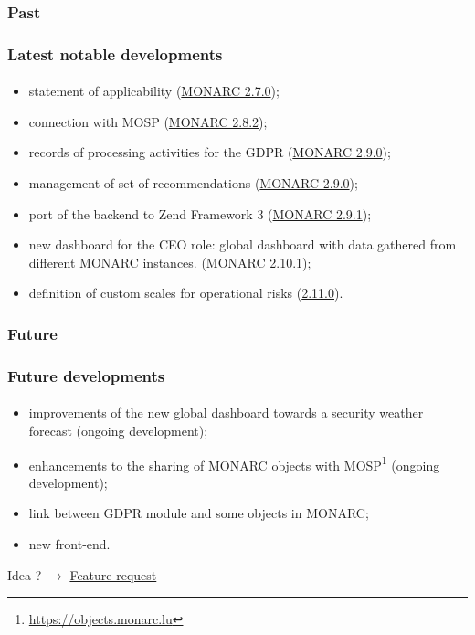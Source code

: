 \subsubsection{Past}
\begin{frame}
    \frametitle{Latest notable developments}
    \framesubtitle{}
    \begin{itemize}
      \item statement of applicability (\href{https://www.monarc.lu/news/2018/08/22/monarc-270-released/}{MONARC 2.7.0});
      \item connection with MOSP (\href{https://www.monarc.lu/news/2019/05/28/monarc-282-released/}{MONARC 2.8.2});
      \item records of processing activities for the GDPR (\href{https://www.monarc.lu/news/2019/08/23/monarc-290-released/}{MONARC 2.9.0});
      \item management of set of recommendations (\href{https://www.monarc.lu/news/2019/08/23/monarc-290-released/}{MONARC 2.9.0});
      \item port of the backend to Zend Framework 3 (\href{https://www.monarc.lu/news/2019/11/25/monarc-291-released/}{MONARC 2.9.1});  
      \item new dashboard for the CEO role: global dashboard with data gathered from different MONARC instances. (MONARC 2.10.1);
      \item definition of custom scales for operational risks (\href{https://www.monarc.lu/news/2021/09/02/monarc-2110-released/}{2.11.0}).
    \end{itemize}
\end{frame}

\subsubsection{Future}
\begin{frame}
    \frametitle{Future developments}
    \framesubtitle{}
    \begin{itemize}
        \item improvements of the new global dashboard towards a security weather forecast (ongoing development);
        \item enhancements to the sharing of MONARC objects with MOSP\footnote{\url{https://objects.monarc.lu}} (ongoing development);
        \item link between GDPR module and some objects in MONARC;
        \item new front-end.
    \end{itemize}
    \bigskip
    Idea ?
    $\rightarrow$
    \href{https://github.com/monarc-project/MonarcAppFO/issues/new?labels=feature+request}{Feature request}
\end{frame}
